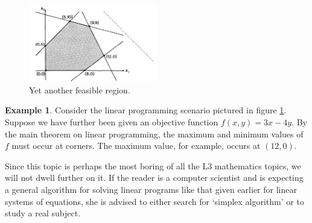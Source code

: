 \documentclass[a4paper,leqno]{article}
\numberwithin{equation}{section}
\theoremstyle{definition}
\newtheorem{ex}[equation]{Example}
\theoremstyle{remark}
\begin{document}
\begin{figure}
  \centering
  \includegraphics[width=0.5\textwidth]{progexample}
  \caption{Yet another feasible region.\label{fig:progexample}}
\end{figure}

\begin{ex}
  Consider the linear programming scenario pictured in figure \ref{fig:progexample}. Suppose we have further been given
  an objective function $ f(x,y) = 3x - 4y $. By the main theorem on linear programming, the maximum and minimum values
  of $ f $ must occur at corners. The maximum value, for example, occurs at $ (12,0) $.
\end{ex}

Since this topic is perhaps the most boring of all the L3 mathematics topics, we will not dwell further on it. If the reader is a
computer scientist and is expecting a general algorithm for solving linear programs like that given earlier for linear systems of
equations, she is advised to either search for `simplex algorithm' or to study a real subject.
\end{document}
